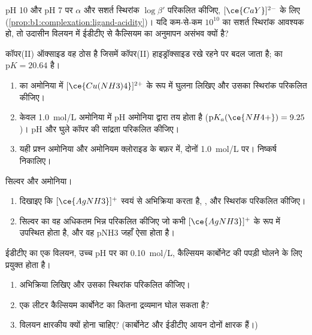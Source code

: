\begin{exercise}[$\star\star$]\label{exo:b1:complexation:9}
pH 10 और pH 7 पर $\alpha$ और सशर्त स्थिरांक $\log\beta'$ परिकलित कीजिए,
$[\ce{CaY}]^{2-}$ के लिए (\cref{prop:b1:complexation:ligand-acidity})। यदि कम-से-कम $10^{10}$ का
सशर्त स्थिरांक आवश्यक हो, तो उदासीन विलयन में
ईडीटीए से कैल्सियम का अनुमापन असंभव क्यों है?
\end{exercise}

\begin{exercise}[$\star\star\star$]\label{exo:b1:complexation:10}
कॉपर(II) ऑक्साइड  वह ठोस है जिसमें कॉपर(II) हाइड्रॉक्साइड
रखे रहने पर बदल जाता है;  का $\mathrm{p}K = 20.64$ है।
\begin{enumerate}
  \item {} का अमोनिया में
        $[\ce{Cu(NH3)4}]^{2+}$ के रूप में घुलना लिखिए और उसका स्थिरांक परिकलित कीजिए।
  \item केवल \qty{1.0}{mol/L} अमोनिया में pH अमोनिया द्वारा तय होता है
        ($\mathrm{p}K_a(\ce{NH4+}) = 9.25$)। pH और
        घुले कॉपर की सांद्रता परिकलित कीजिए।
  \item यही प्रश्न अमोनिया और अमोनियम क्लोराइड के बफ़र में, दोनों
        \qty{1.0}{mol/L} पर। निष्कर्ष निकालिए।
\end{enumerate}
\end{exercise}

\begin{exercise}[$\star\star\star$]\label{exo:b1:complexation:11}
सिल्वर और अमोनिया।
\begin{enumerate}
  \item दिखाइए कि $[\ce{AgNH3}]^{+}$ स्वयं से अभिक्रिया करता है,
        , और स्थिरांक परिकलित कीजिए।
  \item सिल्वर का वह अधिकतम भिन्न परिकलित कीजिए जो कभी
        $[\ce{AgNH3}]^{+}$ के रूप में उपस्थित होता है, और वह pNH3 जहाँ ऐसा होता है।
\end{enumerate}
\end{exercise}

\begin{exercise}[$\star\star\star$]\label{exo:b1:complexation:12}
ईडीटीए का एक विलयन, उच्च pH पर  का \qty{0.10}{mol/L}, कैल्सियम कार्बोनेट
की पपड़ी घोलने के लिए प्रयुक्त होता है।
\begin{enumerate}
  \item अभिक्रिया लिखिए और उसका स्थिरांक परिकलित कीजिए।
  \item एक लीटर कैल्सियम कार्बोनेट का कितना द्रव्यमान घोल सकता है?
  \item विलयन क्षारकीय क्यों होना चाहिए? (कार्बोनेट और ईडीटीए आयन
        दोनों क्षारक हैं।)
\end{enumerate}
\end{exercise}

